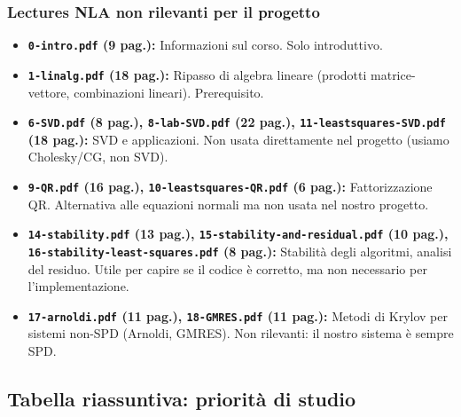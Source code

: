 \documentclass[a4paper,11pt]{article}
\theoremstyle{definition}
\begin{document}
\subsubsection*{ \quad Lectures NLA non rilevanti per il progetto}

\begin{itemize}
  \item \textbf{\texttt{0-intro.pdf} (9 pag.):} Informazioni sul corso. Solo introduttivo.
  \item \textbf{\texttt{1-linalg.pdf} (18 pag.):} Ripasso di algebra lineare (prodotti matrice-vettore, combinazioni lineari). Prerequisito.
  \item \textbf{\texttt{6-SVD.pdf} (8 pag.), \texttt{8-lab-SVD.pdf} (22 pag.), \texttt{11-leastsquares-SVD.pdf} (18 pag.):} SVD e applicazioni. Non usata direttamente nel progetto (usiamo Cholesky/CG, non SVD).
  \item \textbf{\texttt{9-QR.pdf} (16 pag.), \texttt{10-leastsquares-QR.pdf} (6 pag.):} Fattorizzazione QR. Alternativa alle equazioni normali ma non usata nel nostro progetto.
  \item \textbf{\texttt{14-stability.pdf} (13 pag.), \texttt{15-stability-and-residual.pdf} (10 pag.), \texttt{16-stability-least-squares.pdf} (8 pag.):} Stabilità degli algoritmi, analisi del residuo. Utile per capire se il codice è corretto, ma non necessario per l'implementazione.
  \item \textbf{\texttt{17-arnoldi.pdf} (11 pag.), \texttt{18-GMRES.pdf} (11 pag.):} Metodi di Krylov per sistemi non-SPD (Arnoldi, GMRES). Non rilevanti: il nostro sistema è sempre SPD.
\end{itemize}

\subsection{Tabella riassuntiva: priorità di studio}
\end{document}
